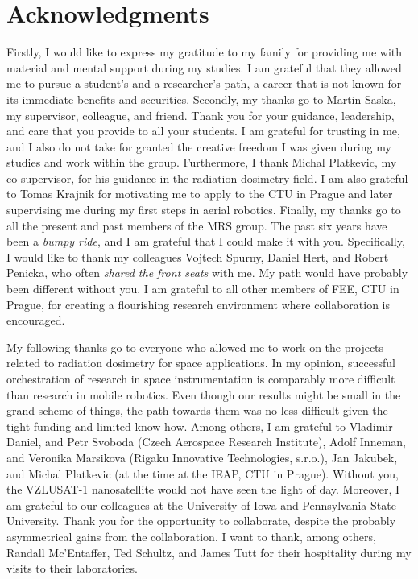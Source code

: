 
\section*{Acknowledgments}

Firstly, I would like to express my gratitude to my family for providing me with material and mental support during my studies.
I am grateful that they allowed me to pursue a student's and a researcher's path, a career that is not known for its immediate benefits and securities.
Secondly, my thanks go to Martin Saska, my supervisor, colleague, and friend.
Thank you for your guidance, leadership, and care that you provide to all your students.
I am grateful for trusting in me, and I also do not take for granted the creative freedom I was given during my studies and work within the group.
Furthermore, I thank Michal Platkevic, my co-supervisor, for his guidance in the radiation dosimetry field.
I am also grateful to Tomas Krajnik for motivating me to apply to the CTU in Prague and later supervising me during my first steps in aerial robotics.
Finally, my thanks go to all the present and past members of the MRS group.
The past six years have been a \emph{bumpy ride}, and I am grateful that I could make it with you.
Specifically, I would like to thank my colleagues Vojtech Spurny, Daniel Hert, and Robert Penicka, who often \emph{shared the front seats} with me.
My path would have probably been different without you.
I am grateful to all other members of FEE, CTU in Prague, for creating a flourishing research environment where collaboration is encouraged.

My following thanks go to everyone who allowed me to work on the projects related to radiation dosimetry for space applications.
In my opinion, successful orchestration of research in space instrumentation is comparably more difficult than research in mobile robotics.
Even though our results might be small in the grand scheme of things, the path towards them was no less difficult given the tight funding and limited know-how.
Among others, I am grateful to Vladimir Daniel, and Petr Svoboda (Czech Aerospace Research Institute), Adolf Inneman, and Veronika Marsikova (Rigaku Innovative Technologies, s.r.o.), Jan Jakubek, and Michal Platkevic (at the time at the IEAP, CTU in Prague).
Without you, the VZLUSAT-1 nanosatellite would not have seen the light of day.
Moreover, I am grateful to our colleagues at the University of Iowa and Pennsylvania State University.
Thank you for the opportunity to collaborate, despite the probably asymmetrical gains from the collaboration.
I want to thank, among others, Randall Mc'Entaffer, Ted Schultz, and James Tutt for their hospitality during my visits to their laboratories.

